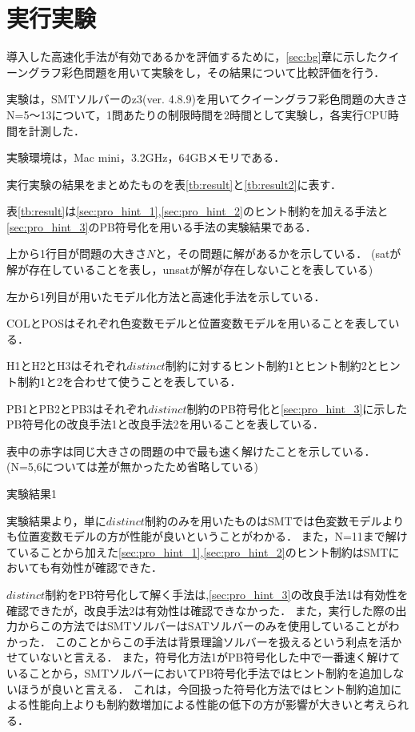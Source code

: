 \chapter{実行実験}\label{sec:exp}

導入した高速化手法が有効であるかを評価するために，\ref{sec:bg}章に示したクイーングラフ彩色問題を用いて実験をし，その結果について比較評価を行う．

実験は，SMTソルバーのz3(ver. 4.8.9)を用いてクイーングラフ彩色問題の大きさN=5〜13について，1問あたりの制限時間を2時間として実験し，各実行CPU時間を計測した．

実験環境は，Mac mini，3.2GHz，64GBメモリである．

実行実験の結果をまとめたものを表\ref{tb:result}と\ref{tb:result2}に表す．

表\ref{tb:result}は\ref{sec:pro_hint_1},\ref{sec:pro_hint_2}のヒント制約を加える手法と\ref{sec:pro_hint_3}のPB符号化を用いる手法の実験結果である．

上から1行目が問題の大きさ$N$と，その問題に解があるかを示している．
(satが解が存在していることを表し，unsatが解が存在しないことを表している)

左から1列目が用いたモデル化方法と高速化手法を示している．

COLとPOSはそれぞれ色変数モデルと位置変数モデルを用いることを表している．

H1とH2とH3はそれぞれ$distinct$制約に対するヒント制約1とヒント制約2とヒント制約1と2を合わせて使うことを表している．

PB1とPB2とPB3はそれぞれ$distinct$制約のPB符号化と\ref{sec:pro_hint_3}に示したPB符号化の改良手法1と改良手法2を用いることを表している．

表中の赤字は同じ大きさの問題の中で最も速く解けたことを示している．
(N=5,6については差が無かったため省略している)

\begin{table}[htb]
    \caption{実験結果1}
{\tiny \label{tb:result}}
\end{table}

実験結果より，単に$distinct$制約のみを用いたものはSMTでは色変数モデルよりも位置変数モデルの方が性能が良いということがわかる．
また，N=11まで解けていることから加えた\ref{sec:pro_hint_1},\ref{sec:pro_hint_2}のヒント制約はSMTにおいても有効性が確認できた．

$distinct$制約をPB符号化して解く手法は,\ref{sec:pro_hint_3}の改良手法1は有効性を確認できたが，改良手法2は有効性は確認できなかった．
また，実行した際の出力からこの方法ではSMTソルバーはSATソルバーのみを使用していることがわかった．
このことからこの手法は背景理論ソルバーを扱えるという利点を活かせていないと言える．
また，符号化方法1がPB符号化した中で一番速く解けていることから，SMTソルバーにおいてPB符号化手法ではヒント制約を追加しないほうが良いと言える．
これは，今回扱った符号化方法ではヒント制約追加による性能向上よりも制約数増加による性能の低下の方が影響が大きいと考えられる．

